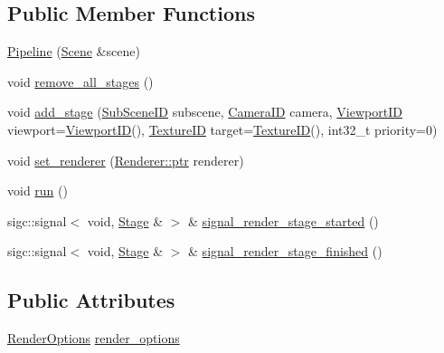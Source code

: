 \subsection*{Public Member Functions}
\begin{DoxyCompactItemize}
\item 
\hyperlink{classkglt_1_1_pipeline_ab0761b4ced66af234089cc4ac0fb988f}{Pipeline} (\hyperlink{classkglt_1_1_scene}{Scene} \&scene)
\item 
void \hyperlink{classkglt_1_1_pipeline_aa62308ebcac926783e5857e419718d7b}{remove\-\_\-all\-\_\-stages} ()
\item 
void \hyperlink{classkglt_1_1_pipeline_a0d4923ffbf3412cca26a751ba86fe7e1}{add\-\_\-stage} (\hyperlink{namespacekglt_a36b738e02745f47c81d1c9991fdc6237}{Sub\-Scene\-I\-D} subscene, \hyperlink{namespacekglt_a2a2b79f136b052b58ec737bd9c885429}{Camera\-I\-D} camera, \hyperlink{namespacekglt_a24d24e429365d0832e56b0082d8e53a0}{Viewport\-I\-D} viewport=\hyperlink{namespacekglt_a24d24e429365d0832e56b0082d8e53a0}{Viewport\-I\-D}(), \hyperlink{namespacekglt_aaea040f25edb7f75ca0f3aa8136a45a1}{Texture\-I\-D} target=\hyperlink{namespacekglt_aaea040f25edb7f75ca0f3aa8136a45a1}{Texture\-I\-D}(), int32\-\_\-t priority=0)
\item 
void \hyperlink{classkglt_1_1_pipeline_aad6b5c6f7ce01202bb938a7f00faaae8}{set\-\_\-renderer} (\hyperlink{classkglt_1_1_renderer_a6e6ebee8ca27407c5bd7103ea325c930}{Renderer\-::ptr} renderer)
\item 
void \hyperlink{classkglt_1_1_pipeline_ac28f91947c918b30ce25cf6752bbd23b}{run} ()
\item 
sigc\-::signal$<$ void, \hyperlink{classkglt_1_1_stage}{Stage} \& $>$ \& \hyperlink{classkglt_1_1_pipeline_aa44d48c1a27c5a62d655d29626fa0627}{signal\-\_\-render\-\_\-stage\-\_\-started} ()
\item 
sigc\-::signal$<$ void, \hyperlink{classkglt_1_1_stage}{Stage} \& $>$ \& \hyperlink{classkglt_1_1_pipeline_affab1bd034b44d978dd205b4a8805114}{signal\-\_\-render\-\_\-stage\-\_\-finished} ()
\end{DoxyCompactItemize}
\subsection*{Public Attributes}
\begin{DoxyCompactItemize}
\item 
\hyperlink{structkglt_1_1_render_options}{Render\-Options} \hyperlink{classkglt_1_1_pipeline_a5bdf27ca82b18656b2d979b13bd8deed}{render\-\_\-options}
\end{DoxyCompactItemize}
